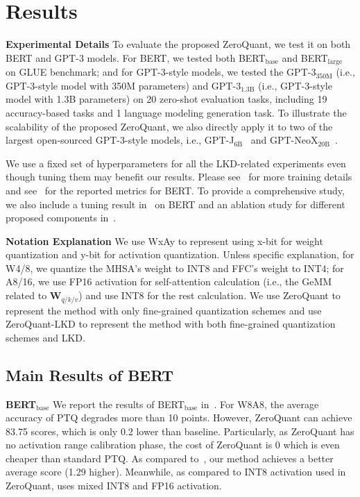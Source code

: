 \section{Results}
\label{sec:results}

\textbf{Experimental Details} To evaluate the proposed ZeroQuant, we test it on both BERT and GPT-3 models. For BERT, we tested both BERT$_\text{base}$ and BERT$_{\text{large}}$ on GLUE benchmark; and for GPT-3-style models, we tested the GPT-3$_{\text{350M}}$ (i.e., GPT-3-style model with 350M parameters) and GPT-3$_{\text{1.3B}}$ (i.e., GPT-3-style model with 1.3B parameters) on 20 zero-shot evaluation tasks, including 19 accuracy-based tasks and 1 language modeling generation task. To illustrate the scalability of the proposed ZeroQuant, we also directly apply it to two of the largest open-sourced GPT-3-style models, i.e., GPT-J$_{\text{6B}}$~\cite{gpt-j} and GPT-NeoX$_{\text{20B}}$~\cite{gpt-neox}. 

We use a fixed set of hyperparameters for all the LKD-related experiments even though tuning them may benefit our results. Please see~ for more training details and see~ for the reported metrics for BERT. To provide a comprehensive study, we also include a tuning result in~ on BERT and an ablation study for different proposed components in~.

\textbf{Notation Explanation} We use WxAy to represent using x-bit for weight quantization and y-bit for activation quantization. Unless specific explanation, for W4/8, we quantize the MHSA's weight to INT8 and FFC's weight to INT4; for A8/16, we use FP16 activation for self-attention calculation (i.e., the GeMM related to ${\bm{W}}_{q/k/v}$) and use INT8 for the rest calculation. We use ZeroQuant to represent the method with only fine-grained quantization schemes and use ZeroQuant-LKD to represent the method with both fine-grained quantization schemes and LKD. 

\subsection{Main Results of BERT}

\textbf{BERT$_\text{base}$}
We report the results of BERT$_\text{base}$ in~. 
For W8A8, the average accuracy of PTQ degrades more than 10 points. However, ZeroQuant can achieve 83.75 scores, which is only 0.2 lower than baseline. Particularly, as ZeroQuant has no activation range calibration phase, the cost of ZeroQuant is $0$ which is even cheaper than standard PTQ. As compared to~\cite{bondarenko2021understanding}, our method achieves a better average score (1.29 higher). Meanwhile, as compared to INT8 activation used in ZeroQuant, \cite{bondarenko2021understanding} uses mixed INT8 and FP16 activation. 

